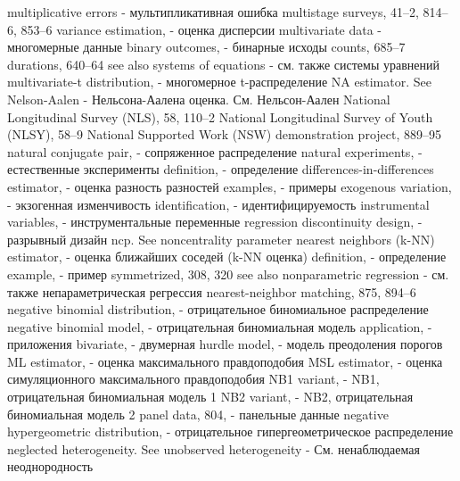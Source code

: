 multiplicative errors - мультипликативная ошибка
multistage surveys, 41–2, 814–6, 853–6
variance estimation, - оценка дисперсии 
multivariate data - многомерные данные
binary outcomes, - бинарные исходы 
counts, 685–7
durations, 640–64
see also systems of equations - см. также системы уравнений
multivariate-t distribution, - многомерное t-распределение
NA estimator. See Nelson-Aalen - Нельсона-Аалена оценка. См. Нельсон-Аален
National Longitudinal Survey (NLS), 58, 110–2 National Longitudinal Survey of Youth (NLSY),
58–9
National Supported Work (NSW) demonstration
project, 889–95
natural conjugate pair, - сопряженное распределение 
natural experiments, - естественные эксперименты
definition, - определение
differences-in-differences estimator, - оценка разность разностей
examples, - примеры
exogenous variation, - экзогенная изменчивость 
identification, - идентифицируемость
instrumental variables, - инструментальные переменные
regression discontinuity design, - разрывный дизайн 
ncp. See noncentrality parameter
nearest neighbors (k-NN) estimator, - оценка ближайших соседей (k-NN оценка)
definition, - определение
example, - пример
symmetrized, 308, 320
see also nonparametric regression - см. также непараметрическая регрессия
nearest-neighbor matching, 875, 894–6 
negative binomial distribution, - отрицательное биномиальное распределение
negative binomial model, - отрицательная биномиальная модель
application, - приложения 
bivariate, - двумерная
hurdle model, - модель преодоления порогов
ML estimator, - оценка максимального правдоподобия
MSL estimator, - оценка симуляционного максимального правдоподобия 
NB1 variant, - NB1, отрицательная биномиальная модель 1
NB2 variant, - NB2, отрицательная биномиальная модель 2
panel data, 804, - панельные данные
negative hypergeometric distribution, - отрицательное гипергеометрическое распределение 
neglected heterogeneity. See unobserved heterogeneity - См. ненаблюдаемая неоднородность

